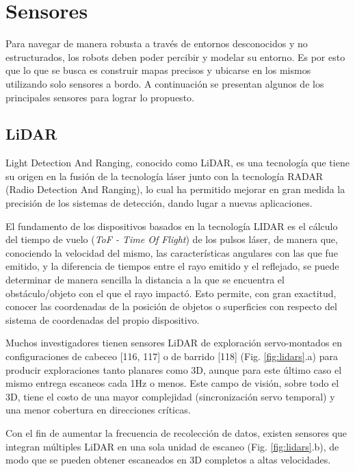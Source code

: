 \section{Sensores}
Para navegar de manera robusta a través de entornos desconocidos y no estructurados, los robots deben poder percibir y modelar su entorno. Es por esto que lo que se busca es construir mapas precisos y ubicarse en los mismos utilizando solo sensores a bordo. A continuación se presentan algunos de los principales sensores para lograr lo propuesto.

\subsection{LiDAR}
Light Detection And Ranging, conocido como LiDAR, es una tecnología que tiene su origen en la fusión de la tecnología láser junto con la tecnología RADAR (Radio Detection And Ranging), lo cual ha permitido mejorar en gran medida la precisión de los sistemas de detección, dando lugar a nuevas aplicaciones. 

El  fundamento de los dispositivos basados en la tecnología LIDAR es el cálculo del tiempo de vuelo (\textit{ToF - Time  Of Flight}) de los pulsos láser, de manera que, conociendo la velocidad del mismo, las características angulares con las que fue emitido, y la diferencia de tiempos entre el rayo emitido y el reflejado, se puede determinar de manera sencilla la distancia a la que se encuentra el obstáculo/objeto con el que el rayo impactó. Esto permite, con gran exactitud, conocer las coordenadas de la posición de objetos o superficies con respecto del sistema de coordenadas del propio dispositivo.

Muchos investigadores tienen sensores LiDAR de exploración servo-montados en configuraciones de cabeceo [116, 117] o de barrido [118] (Fig. \ref{fig:lidars}.a) para producir exploraciones tanto planares como 3D, aunque para este último caso el mismo entrega escaneos cada 1Hz o menos. Este campo de visión, sobre todo el 3D, tiene el costo de una mayor complejidad (sincronización servo temporal) y una menor cobertura en direcciones críticas.

\begin{large}
[pfingsthron2012][newman2006][bosse2009]
\end{large}

Con el fin de aumentar la frecuencia de recolección de datos, existen sensores que integran múltiples LiDAR en una sola unidad de escaneo (Fig. \ref{fig:lidars}.b), de modo que se pueden obtener escaneados en 3D completos a altas velocidades.

